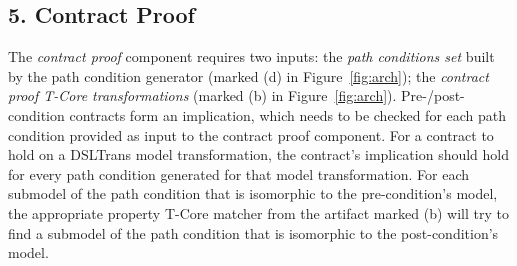 
 
\subsection*{5. Contract Proof}

The \emph{contract proof} component requires two inputs: the \emph{path
conditions set} built by the path condition generator (marked (d) in Figure~\ref{fig:arch}); the \emph{contract
proof T-Core transformations} (marked (b) in Figure~\ref{fig:arch}).
Pre-/post- condition contracts form an implication, which needs to be checked
for each path condition provided as input to the contract proof component. For a
contract to hold on a DSLTrans model transformation, the contract's implication
should hold for every path condition generated for that model transformation.
For each submodel of the path condition that is isomorphic to the
pre-condition's model, the appropriate property T-Core matcher from the artifact marked (b) will try to find
a submodel of the path condition that is isomorphic to the post-condition's
model. 


